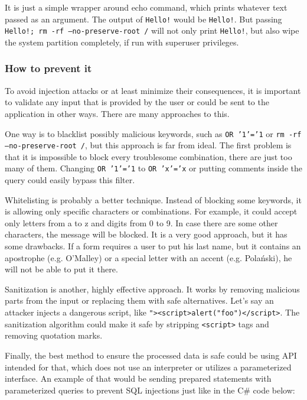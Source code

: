 \documentclass[a4paper]{article}
\begin{document}
It is just a simple wrapper around echo command, which prints whatever text
passed as an argument. The output of \texttt{Hello!} would be \texttt{Hello!}.
But passing \texttt{Hello!; rm -rf --no-preserve-root /} will not only print
\texttt{Hello!}, but also wipe the system partition completely, if run with 
superuser privileges.

\subsubsection{How to prevent it}

To avoid injection attacks or at least minimize their consequences, it is
important to validate any input that is provided by the user or could be sent to
the application in other ways. There are many approaches to this.

One way is to blacklist possibly malicious keywords, such as \texttt{OR '1'='1}
or \texttt{rm -rf --no-preserve-root /}, but this approach is far from ideal.
The first problem is that it is impossible to block every troublesome
combination, there are just too many of them. Changing \texttt{OR '1'='1} to
\texttt{OR 'x'='x} or putting comments inside the query could easily bypass
this filter.

Whitelisting is probably a better technique. Instead of blocking some keywords,
it is allowing only specific characters or combinations. For example, it could
accept only letters from a to z and digits from 0 to 9. In case there are some
other characters, the message will be blocked. It is a very good approach, but
it has some drawbacks. If a form requires a user to put his last name, but it
contains an apostrophe (e.g. O'Malley) or a special letter with an accent (e.g.
Polański), he will not be able to put it there.

Sanitization is another, highly effective approach. It works by removing
malicious parts from the input or replacing them with safe alternatives. Let's
say an attacker injects a dangerous script, like
\texttt{"><script>alert("foo")</script>}. The sanitization algorithm could make
it safe by stripping \texttt{<script>} tags and removing quotation marks.

Finally, the best method to ensure the processed data is safe could be using
API intended for that, which does not use an interpreter or utilizes a
parameterized interface. An example of that would be sending prepared statements
with parameterized queries to prevent SQL injections just like in the C\# code
below:
\end{document}
